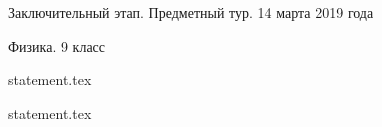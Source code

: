 \documentclass[a4paper,11pt, oneside]{book}
\begin{document}
\vspace{-3mm}
\vspace{-5mm}

\normalsize

\begin{center}
    Заключительный этап. Предметный тур. 14 марта 2019 года
    
    Физика. 9 класс
\end{center}

\parindent=0cm

%

{statement.tex}

\newpage

{statement.tex}
\end{document}
